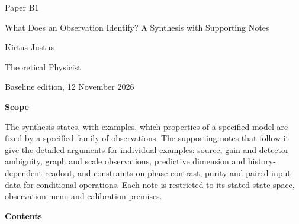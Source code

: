 \documentclass[11pt,a4paper]{article}
\begin{document}
\thispagestyle{empty}\pagestyle{empty}
{\small\sffamily \ProgramTitle\hfill Paper B1\par}
\vspace*{12mm}
{\LARGE\bfseries\raggedright{} What Does an Observation Identify? A Synthesis with Supporting Notes\par}
\vspace{9mm}
{\large Kirtus Justus\par}\vspace{1mm}Theoretical Physicist\par\AuthorLocation\par\vspace{2mm}Baseline edition, 12 November 2026\par\vspace{8mm}
\textbf{Scope}\par
The synthesis states, with examples, which properties of a specified model are fixed by a specified family of observations. The supporting notes that follow it give the detailed arguments for individual examples: source, gain and detector ambiguity, graph and scale observations, predictive dimension and history-dependent readout, and constraints on phase contrast, purity and paired-input data for conditional operations. Each note is restricted to its stated state space, observation menu and calibration premises.\par\vspace{5mm}
\textbf{Contents}\par\vspace{1mm}
\end{document}
